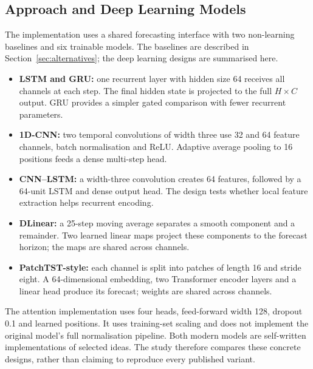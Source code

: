 \documentclass[11pt,a4paper]{article}
\begin{document}
\subsection{Approach and Deep Learning Models}
The implementation uses a shared forecasting interface with two non-learning baselines and six trainable models. The baselines are described in Section~\ref{sec:alternatives}; the deep learning designs are summarised here.
\begin{itemize}
\item \textbf{LSTM and GRU:} one recurrent layer with hidden size 64 receives all channels at each step. The final hidden state is projected to the full $H\times C$ output. GRU provides a simpler gated comparison with fewer recurrent parameters.
\item \textbf{1D-CNN:} two temporal convolutions of width three use 32 and 64 feature channels, batch normalisation and ReLU. Adaptive average pooling to 16 positions feeds a dense multi-step head.
\item \textbf{CNN--LSTM:} a width-three convolution creates 64 features, followed by a 64-unit LSTM and dense output head. The design tests whether local feature extraction helps recurrent encoding.
\item \textbf{DLinear:} a 25-step moving average separates a smooth component and a remainder. Two learned linear maps project these components to the forecast horizon; the maps are shared across channels.
\item \textbf{PatchTST-style:} each channel is split into patches of length 16 and stride eight. A 64-dimensional embedding, two Transformer encoder layers and a linear head produce its forecast; weights are shared across channels.
\end{itemize}
The attention implementation uses four heads, feed-forward width 128, dropout 0.1 and learned positions. It uses training-set scaling and does not implement the original model's full normalisation pipeline. Both modern models are self-written implementations of selected ideas. The study therefore compares these concrete designs, rather than claiming to reproduce every published variant.
\end{document}

